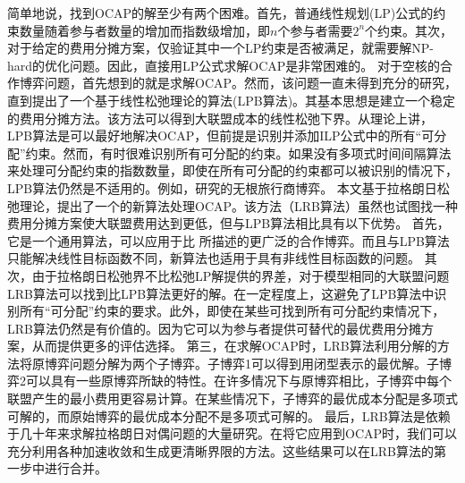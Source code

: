 \documentclass[UTF8]{article}
\begin{document}
简单地说，找到OCAP的解至少有两个困难。首先，普通线性规划(LP)公式的约束数量随着参与者数量的增加而指数级增加，即$n$个参与者需要$2^n$个约束。其次，对于给定的费用分摊方案，仅验证其中一个LP约束是否被满足，就需要解NP-hard的优化问题。因此，直接用LP公式求解OCAP是非常困难的。
对于空核的合作博弈问题，首先想到的就是求解OCAP。然而，该问题一直未得到充分的研究，直到\cite{Caprara2010LPB}提出了一个基于线性松弛理论的算法(LPB算法)。其基本思想是建立一个稳定的费用分摊方法。该方法可以得到大联盟成本的线性松弛下界。从理论上讲，LPB算法是可以最好地解决OCAP，但前提是识别并添加ILP公式中的所有“可分配”约束。然而，有时很难识别所有可分配的约束。如果没有多项式时间间隔算法来处理可分配约束的指数数量，即使在所有可分配的约束都可以被识别的情况下，LPB算法仍然是不适用的。例如，研究的无根旅行商博弈。
本文基于拉格朗日松弛理论，提出了一个的新算法处理OCAP。该方法（LRB算法）虽然也试图找一种费用分摊方案使大联盟费用达到更低，但与LPB算法相比具有以下优势。
首先，它是一个通用算法，可以应用于比
\cite{Caprara2010LPB}所描述的更广泛的合作博弈。而且与LPB算法只能解决线性目标函数不同，新算法也适用于具有非线性目标函数的问题。
其次，由于拉格朗日松弛界不比松弛LP解提供的界差，对于模型相同的大联盟问题LRB算法可以找到比LPB算法更好的解。在一定程度上，这避免了LPB算法中识别所有“可分配”约束的要求。此外，即使在某些可找到所有可分配约束情况下，LRB算法仍然是有价值的。因为它可以为参与者提供可替代的最优费用分摊方案，从而提供更多的评估选择。
第三，在求解OCAP时，LRB算法利用分解的方法将原博弈问题分解为两个子博弈。子博弈1可以得到用闭型表示的最优解。子博弈2可以具有一些原博弈所缺的特性。在许多情况下与原博弈相比，子博弈中每个联盟产生的最小费用更容易计算。在某些情况下，子博弈的最优成本分配是多项式可解的，而原始博弈的最优成本分配不是多项式可解的。
最后，LRB算法是依赖于几十年来求解拉格朗日对偶问题的大量研究。在将它应用到OCAP时，我们可以充分利用各种加速收敛和生成更清晰界限的方法。这些结果可以在LRB算法的第一步中进行合并。
\end{document}
